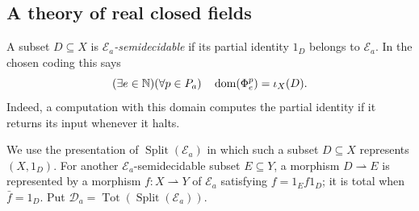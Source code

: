 \subsection{A theory of real closed fields}
\label{subsec:miller-field-theory}

A subset $D\subseteq X$ is \emph{$\mathcal E_a$-semidecidable} if
its partial identity $1_D$ belongs to $\mathcal E_a$. In the chosen
coding this says
\[
 (\exists e\in\mathbb N)(\forall p\in P_a)\quad
 \operatorname{dom}(\Phi_e^p)=\iota_X(D).
\]
Indeed, a computation with this domain computes the partial identity
if it returns its input whenever it halts.

We use the presentation of $\operatorname{Split}(\mathcal E_a)$
in which such a subset $D\subseteq X$ represents $(X,1_D)$.
For another $\mathcal E_a$-semidecidable subset $E\subseteq Y$,
a morphism $D\rightharpoonup E$ is represented by
a morphism $f:X\rightharpoonup Y$ of $\mathcal E_a$ satisfying
$f=1_Ef1_D$; it is total when $\bar f=1_D$.
Put $\mathcal D_a=\operatorname{Tot}(\operatorname{Split}(\mathcal E_a))$.

